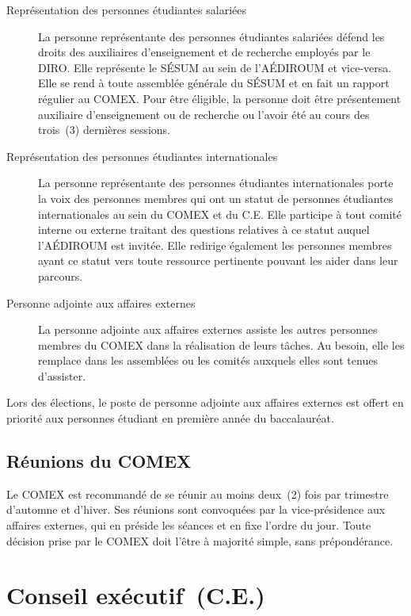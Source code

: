 \documentclass{aediroum}
\begin{document}
\begin{description}
    \item[Représentation des personnes étudiantes salariées]
        La personne représentante des personnes étudiantes salariées défend les droits des auxiliaires d’enseignement et de recherche employés par le DIRO.
        Elle représente le SÉSUM au sein de l’AÉDIROUM et vice-versa.
        Elle se rend à toute assemblée générale du SÉSUM et en fait un rapport régulier au COMEX.
        Pour être éligible, la personne doit être présentement auxiliaire d’enseignement ou de recherche ou l’avoir été au cours des trois~(3) dernières sessions.

    \item[Représentation des personnes étudiantes internationales]
        La personne représentante des personnes étudiantes internationales porte la voix des personnes membres qui ont un statut de personnes étudiantes internationales au sein du COMEX et du C.E.
        Elle participe à tout comité interne ou externe traitant des questions relatives à ce statut auquel l’AÉDIROUM est invitée.
        Elle redirige également les personnes membres ayant ce statut vers toute ressource pertinente pouvant les aider dans leur parcours.

    \item[Personne adjointe aux affaires externes]
        La personne adjointe aux affaires externes assiste les autres personnes membres du COMEX dans la réalisation de leurs tâches.
        Au besoin, elle les remplace dans les assemblées ou les comités auxquels elles sont tenues d’assister.
\end{description}

Lors des élections, le poste de personne adjointe aux affaires externes est offert en priorité aux personnes étudiant en première année du baccalauréat.

\subsection{Réunions du COMEX}

Le COMEX est recommandé de se réunir au moins deux~(2) fois par trimestre d’automne et d’hiver.
Ses réunions sont convoquées par la vice-présidence aux affaires externes, qui en préside les séances et en fixe l’ordre du jour.
Toute décision prise par le COMEX doit l’être à majorité simple, sans prépondérance.

\section{Conseil exécutif~(C.E.)}
\end{document}

